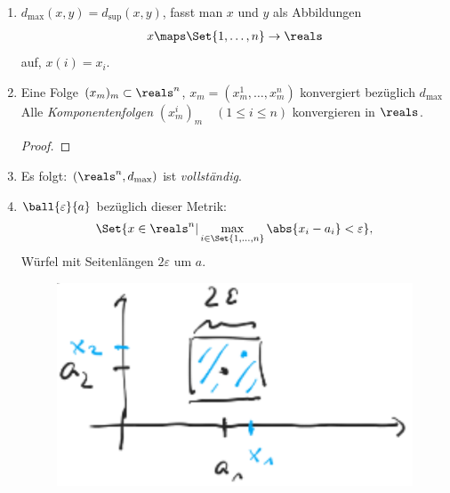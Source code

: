 \begin{bemerkungen*}
    \begin{enumerate}
        \item \( d_{\max}(x,y)=d_{\sup}(x,y)\), fasst man \( x\) und \( y\) als Abbildungen
        \begin{align*}
            x\maps \Set{1,\ldots, n}\to \reals 
        \end{align*} 
        auf, \( x(i)=x_i\).
        \item \label{d_max:folgenkonvergenz}Eine Folge \( (x_m)_m\subset \reals^n \), \( x_m=(x_m^1,\ldots, x_m^n)\) konvergiert bezüglich \( d_{\max}\) \tiff Alle \emph{Komponentenfolgen} \( (x_m^i)_m\quad (1\leq i\leq n)\) konvergieren in \( \reals \).
        \begin{proof}
            
            
        \end{proof}
        
        \item Es folgt: \( (\reals^n, d_{\max})\) ist \emph{vollständig}.
        \item \( \ball{\varepsilon}{a}\) bezüglich dieser Metrik:
        \begin{align*}
            \Set{x\in \reals ^n |\max_{i\in \Set{1,\ldots, n}}\abs{x_i-a_i}<\varepsilon},
        \end{align*}
        Würfel mit Seitenlängen \( 2\varepsilon\) um \( a\).
        \begin{figure}[H]
            \centering
            \includegraphics[width=0.3\linewidth]{figures/d_max_ball}
            \label{fig:d_max_ball}
        \end{figure}
        
    \end{enumerate}
\end{bemerkungen*}

